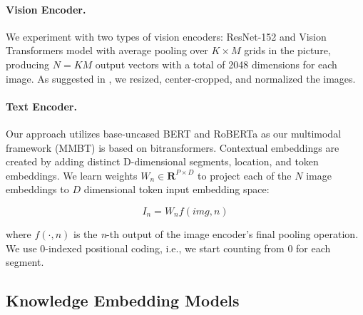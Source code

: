 {\vspace{-1.5mm}
\paragraph{Vision Encoder.}
\label{vision-encoder}
We experiment with two types of vision encoders: ResNet-152 \cite{he2015deep} and Vision Transformers \cite{dosovitskiy2021image} model with average pooling over \begin{math} K \times M \end{math} grids in the picture, producing \begin{math} N = KM \end{math} output vectors with a total of 2048 dimensions for each image. As suggested in \cite{kiela2020supervised}, we resized, center-cropped, and normalized the images.


\vspace{-1.5mm}
\paragraph{Text Encoder.}
\label{text-encoder}

Our approach utilizes base-uncased BERT \cite{devlin2018bert} and RoBERTa \cite{liu2019roberta} as our multimodal framework (MMBT) is based on bitransformers. Contextual embeddings are created by adding distinct D-dimensional segments, location, and token embeddings. We learn weights $W_n \in \mathbf{R}^{P\times D}$ to project each of the $N$ image embeddings to $D$ dimensional token input embedding space: 

\begin{equation}
    I_n = W_nf(img,n)
\end{equation}

where $f(·, n)$ is the \textit{n}-th output of the image encoder’s final pooling operation. We use 0-indexed positional coding, i.e., we start counting from 0 for each segment. 

\subsection{Knowledge Embedding Models}
\label{sec:knowledge-embedding-models}

}
